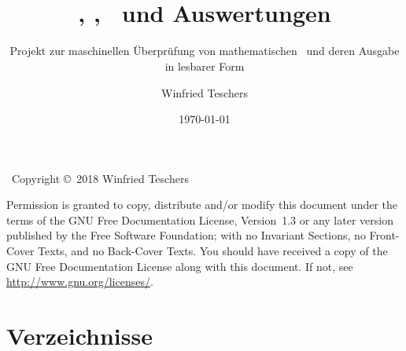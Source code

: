 \titlehead{
	{\Large Dr. Winfried Teschers}\\
	Anton-Günther-Straße 26c\\91083 Baiersdorf\\
	{\footnotesize winfried.teschers@t-online.de}
}
\subject{Projektdokument}
\title{{\Huge \ASBA}\\\Axiome, \Saetze, \Beweise\ und Auswertungen}
\subtitle{Projekt zur maschinellen Überprüfung von mathematischen \Beweisen\ und deren Ausgabe in lesbarer Form}
\author{Winfried Teschers}
\date{\today}
\publishers{\vspace{1cm}\normalsize
	Es wird ein Programmsystem beschrieben, das zu eingegebenen \Axiomen, \Saetzen\ und \Beweisen\ letztere prüft, \Auswertungen\ generiert und unter Zuhilfenahme gegebener \Ausgabeschemata\ eine Ausgabe im \LaTeX-Format in mathematisch üblicher Schreibweise mit \Formeln\ erstellt.
}



	\maketitle
	~\vfill Copyright \copyright\ 2018 Winfried Teschers\bigskip

	\begin{otherlanguage}{english}
		Permission is granted to copy, distribute and/or modify this document under the terms of the GNU Free Documentation License, Version~1.3 or any later version published by the Free Software Foundation; with no Invariant Sections, no Front-Cover Texts, and no Back-Cover Texts.
		You should have received a copy of the GNU Free Documentation License along with this document.
		If not, see \url{http://www.gnu.org/licenses/}.
	\end{otherlanguage}

	\tableofcontents
	\Endchapter

	
	
	
	\color{gray}%
	
	\color{black}%
	
	

	\chapter     {Verzeichnisse}%
	\label   {app-Verzeichnisse}

